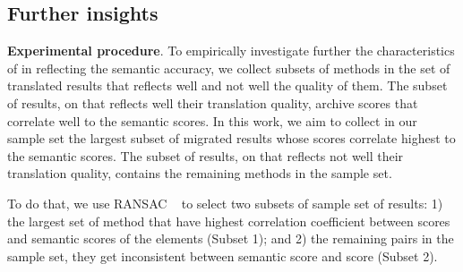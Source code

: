 \subsection{Further insights}
\textbf{Experimental procedure}. To empirically investigate further the characteristics of {\model} in reflecting the semantic accuracy, we collect subsets of methods in the
set of translated results that {\model} reflects well and not well the 
quality of them. The subset of results, on that {\model} reflects well 
their translation quality, archive {\model} scores that correlate well to 
the semantic scores. In this work, we aim to collect in our sample set 
the largest subset of migrated results whose {\model} scores correlate 
highest to the semantic scores. The subset of results, on that {\model} 
reflects not well their translation quality, contains the remaining 
methods in the sample set.


%


To do that, we use RANSAC ~\cite{Fischler:1981:RSC:358669.358692} to select two subsets of sample set of results:  
1) the largest set of method that have highest correlation coefficient 
between {\model} scores and semantic scores of the elements (Subset 1); and 2) the remaining pairs in the sample set, they get inconsistent between semantic score and {\model} score (Subset 2).

